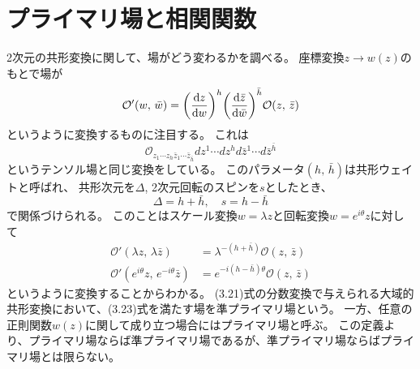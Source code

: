 \documentclass[../../master.tex]{subfiles}
\begin{document}
\section{プライマリ場と相関関数}
2次元の共形変換に関して、場がどう変わるかを調べる。
座標変換\(z\rightarrow w(z)\)のもとで場が
\begin{equation}
    \mathcal{O}'(w,\,\bar{w}) = \qty(\dv{z}{w})^{h}\qty(\dv{\bar{z}}{\bar{w}})^{\bar{h}}\mathcal{O}(z,\,\bar{z})
\end{equation}
というように変換するものに注目する。
これは
\begin{equation*}
    \mathcal{O}_{z_1\cdots z_h \bar{z}_1\cdots \bar{z}_{\bar{h}}}dz^1\cdots dz^h d\bar{z}^1\cdots d\bar{z}^{\bar{h}}
\end{equation*}
というテンソル場と同じ変換をしている。
このパラメータ\((h,\,\bar{h})\)は共形ウェイトと呼ばれ、
共形次元を\(\Delta\), 2次元回転のスピンを\(s\)としたとき、
\begin{equation}
    \Delta =h + \bar{h},\quad s = h - \bar{h}
\end{equation}
で関係づけられる。
このことはスケール変換\(w=\lambda z\)と回転変換\(w=e^{i\theta}z\)に対して
\begin{align}
    \mathcal{O}'(\lambda z,\,\lambda\bar{z}) &= \lambda^{-(h + \bar{h})}\mathcal{O}(z,\,\bar{z})\\
    \mathcal{O}'(e^{i\theta} z,\,e^{-i\theta}\bar{z}) &= e^{-i(h-\bar{h})\theta}\mathcal{O}(z,\,\bar{z})
\end{align}
というように変換することからわかる。
(3.21)式の分数変換で与えられる大域的共形変換において、(3.23)式を満たす場を準プライマリ場という。
一方、任意の正則関数\(w(z)\)に関して成り立つ場合にはプライマリ場と呼ぶ。
この定義より、プライマリ場ならば準プライマリ場であるが、準プライマリ場ならばプライマリ場とは限らない。
\end{document}
